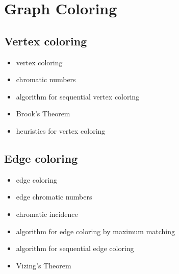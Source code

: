 
\chapter{Graph Coloring}
\label{chap:graph_coloring}



\section{Vertex coloring}

\begin{itemize}
\item vertex coloring

\item chromatic numbers

\item algorithm for sequential vertex coloring

\item Brook's Theorem

\item heuristics for vertex coloring
\end{itemize}



\section{Edge coloring}

\begin{itemize}
\item edge coloring

\item edge chromatic numbers

\item chromatic incidence

\item algorithm for edge coloring by maximum matching

\item algorithm for sequential edge coloring

\item Vizing's Theorem
\end{itemize}


